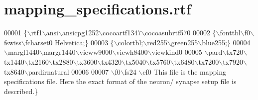 \hypertarget{mapping__specifications_8rtf_source}{}\section{mapping\+\_\+specifications.\+rtf}

\begin{DoxyCode}
00001 \{\(\backslash\)rtf1\(\backslash\)ansi\(\backslash\)ansicpg1252\(\backslash\)cocoartf1347\(\backslash\)cocoasubrtf570
00002 \{\(\backslash\)fonttbl\(\backslash\)f0\(\backslash\)fswiss\(\backslash\)fcharset0 Helvetica;\}
00003 \{\(\backslash\)colortbl;\(\backslash\)red255\(\backslash\)green255\(\backslash\)blue255;\}
00004 \(\backslash\)margl1440\(\backslash\)margr1440\(\backslash\)vieww9000\(\backslash\)viewh8400\(\backslash\)viewkind0
00005 \(\backslash\)pard\(\backslash\)tx720\(\backslash\)tx1440\(\backslash\)tx2160\(\backslash\)tx2880\(\backslash\)tx3600\(\backslash\)tx4320\(\backslash\)tx5040\(\backslash\)tx5760\(\backslash\)tx6480\(\backslash\)tx7200\(\backslash\)tx7920\(\backslash\)tx8640\(\backslash\)pardirnatural
00006 
00007 \(\backslash\)f0\(\backslash\)fs24 \(\backslash\)cf0 This file is the mapping specifications file. Here the exact format of the neuron/
      synapse setup file is described.\}
\end{DoxyCode}
